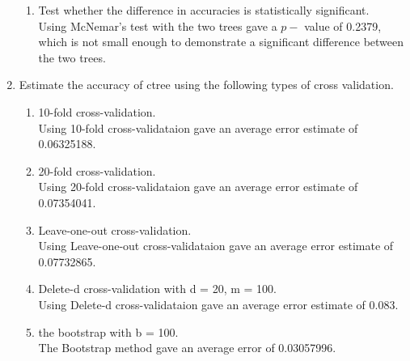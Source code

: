 \documentclass[11pt]{article}
\begin{document}
\begin{enumerate}
\begin{enumerate}
\item Test whether the difference in accuracies is statistically significant. \\
Using McNemar's test with the two trees gave a $p-$ value of 0.2379, which is not 
small enough to demonstrate a significant difference between the two trees. 

\end{enumerate}
\item Estimate the accuracy of ctree using the following types of cross validation. \\

\begin{enumerate}
\item 10-fold cross-validation.\\
Using 10-fold cross-validataion gave an average error estimate of 0.06325188.
\item 20-fold cross-validation. \\
Using 20-fold cross-validataion gave an average error estimate of 0.07354041.
\item Leave-one-out cross-validation. \\
Using Leave-one-out cross-validataion gave an average error 
estimate of 0.07732865.
\item Delete-d cross-validation with d = 20, m = 100.\\
Using Delete-d cross-validataion gave an average error estimate of  0.083.
\item the bootstrap with b = 100.\\
The Bootstrap method gave an average error of 0.03057996.
\end{enumerate}
\end{enumerate}
\singlespace
\end{document}
